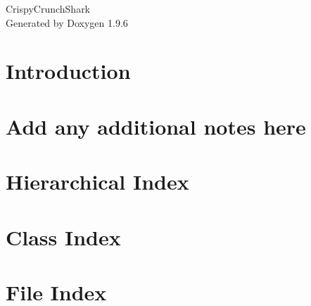 \documentclass[twoside]{book}
\newcommand{\+}{\discretionary{\mbox{\scriptsize$\hookleftarrow$}}{}{}}
\newcommand{\clearemptydoublepage}{%
    \newpage{\pagestyle{empty}\cleardoublepage}%
  }
\begin{document}
  \raggedbottom
    \hypersetup{pageanchor=false,
                bookmarksnumbered=true,
                pdfencoding=unicode
               }
  \begin{titlepage}
  \vspace*{7cm}
  \begin{center}%
  {\Large Crispy\+Crunch\+Shark}\\
  \vspace*{1cm}
  {\large Generated by Doxygen 1.9.6}\\
  \end{center}
  \end{titlepage}
  \clearemptydoublepage
  \tableofcontents
  \clearemptydoublepage
  \hypersetup{pageanchor=true}
\chapter{Introduction}
\label{md_py__r_e_a_d_m_e}

\chapter{Add any additional notes here}
\label{md__r_e_a_d_m_e}

\chapter{Hierarchical Index}

\chapter{Class Index}

\chapter{File Index}

\end{document}
